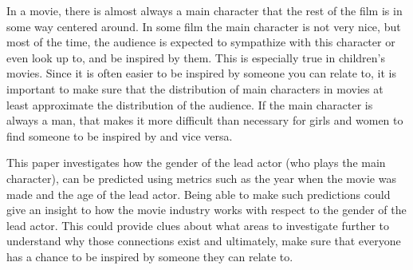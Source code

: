 \documentclass[../../project.tex]{subfiles}
\begin{document}
	In a movie, there is almost always a main character that the rest of the film is in some way centered around. In some film the main character is not very nice, but most of the time, the audience is expected to sympathize with this character or even look up to, and be inspired by them. This is especially true in children's movies. Since it is often easier to be inspired by someone you can relate to, it is important to make sure that the distribution of main characters in movies at least approximate the distribution of the audience. If the main character is always a man, that makes it more difficult than necessary for girls and women to find someone to be inspired by and vice versa.
	
	This paper investigates how the gender of the lead actor (who plays the main character), can be predicted using metrics such as the year when the movie was made and the age of the lead actor. Being able to make such predictions could give an insight to how the movie industry works with respect to the gender of the lead actor. This could provide clues about what areas to investigate further to understand why those connections exist and ultimately, make sure that everyone has a chance to be inspired by someone they can relate to.
\end{document}
